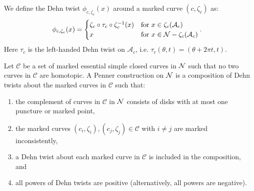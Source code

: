  We define the Dehn twist $\phi_{c,\zeta_c}(x)$ around a marked curve $(c,\zeta_c)$ as:
\begin{align*}
  \phi_{c,\zeta_c}(x) =
  \begin{cases}
    \zeta_c \circ \tau_c \circ \zeta_c^{-1}(x) & \text{for } x \in \zeta_c(\mathcal{A}_c) \\
    x & \text{for } x \in \mathcal{N} - \zeta_c(\mathcal{A}_c)
  \end{cases}.
\end{align*}
Here $\tau_c$ is the left-handed Dehn twist on $\mathcal{A}_c$, i.e. $\tau_c(\theta,t) = (\theta + 2\pi t,t)$. 

 Let $\mathcal{C}$ be a set of marked essential simple closed curves in $\mathcal{N}$ such that no two curves in $\mathcal{C}$ are homotopic.  A Penner construction on $\mathcal{N}$ is a composition of Dehn twists about the marked curves in $\mathcal{C}$ such that:
\begin{enumerate}
\item the complement of curves in $\mathcal{C}$ in $\mathcal{N}$ consists of disks with at most one puncture or marked point,
    \item the marked curves $(c_i,\zeta_i),(c_j,\zeta_j)\in\mathcal{C}$ with $i\neq j$ are marked inconsistently,
    \item a Dehn twist about each marked curve in $\mathcal{C}$ is included in the composition, and
    \item all powers of Dehn twists are positive (alternatively, all powers are negative).
\end{enumerate}




